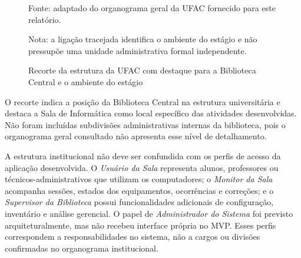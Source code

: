 \begin{figure}[htbp]
  \centering
  \caption{Recorte da estrutura da UFAC com destaque para a Biblioteca Central e o ambiente do estágio}
  \label{fig:organograma-biblioteca}
  \par\smallskip
  {\footnotesize Fonte: adaptado do organograma geral da UFAC fornecido para este relatório.}
  \par\smallskip
  {\footnotesize Nota: a ligação tracejada identifica o ambiente do estágio e não pressupõe uma unidade administrativa formal independente.}
\end{figure}

O recorte indica a posição da Biblioteca Central na estrutura universitária e destaca a Sala de Informática como local específico das atividades desenvolvidas. Não foram incluídas subdivisões administrativas internas da biblioteca, pois o organograma geral consultado não apresenta esse nível de detalhamento.

A estrutura institucional não deve ser confundida com os perfis de acesso da aplicação desenvolvida. O \emph{Usuário da Sala} representa alunos, professores ou técnicos-administrativos que utilizam os computadores; o \emph{Monitor da Sala} acompanha sessões, estados dos equipamentos, ocorrências e correções; e o \emph{Supervisor da Biblioteca} possui funcionalidades adicionais de configuração, inventário e análise gerencial. O papel de \emph{Administrador do Sistema} foi previsto arquiteturalmente, mas não recebeu interface própria no MVP. Esses perfis correspondem a responsabilidades no sistema, não a cargos ou divisões confirmadas no organograma institucional.

